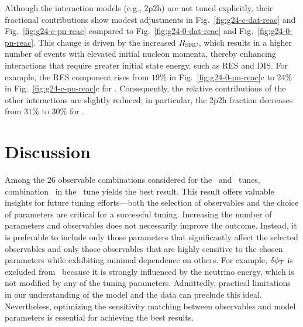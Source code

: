     Although the interaction models (e.g., 2p2h) are not tuned explicitly, their fractional contributions show modest adjustments in Fig.~\ref{fig:g24-c-dat-reac} and Fig.~\ref{fig:g24-c-pn-reac} compared to Fig.~\ref{fig:g24-0-dat-reac} and Fig.~\ref{fig:g24-0-pn-reac}. 
    This change is driven by the increased $R_\textrm{SRC}$, which results in a higher number of events with elevated initial nucleon momenta, thereby enhancing interactions that require greater initial state energy, such as RES and DIS. 
    For example, the RES component rises from $19\%$ in Fig.~\ref{fig:g24-0-pn-reac}c to $24\%$ in Fig.~\ref{fig:g24-c-pn-reac}c for \minzpi. 
    Consequently, the relative contributions of the other interactions are slightly reduced; in particular, the 2p2h fraction decreases from $31\%$ to $30\%$ for \minzpi.

\section{Discussion}
Among the 26 observable combinations considered for the \allpar\ and \redpar\ tunes, combination \cbRedPar\ in the \redpar\ tune yields the best result.
This result offers valuable insights for future tuning efforts—both the selection of observables and the choice of parameters are critical for a successful tuning.
Increasing the number of parameters and observables does not necessarily improve the outcome.
Instead, it is preferable to include only those parameters that significantly affect the selected observables and only those observables that are highly sensitive to the chosen parameters while exhibiting minimal dependence on others.
For example, $\delta\phi_\textrm{T}$ is excluded from \cbRedPar\ because it is strongly influenced by the neutrino energy, which is not modified by any of the tuning parameters.
Admittedly, practical limitations in our understanding of the model and the data can preclude this ideal.
Nevertheless, optimizing the sensitivity matching between observables and model parameters is essential for achieving the best results.

